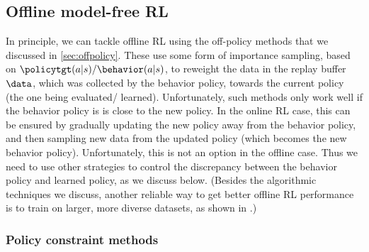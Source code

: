 





\subsection{Offline model-free RL}


In principle, we can tackle offline RL using the off-policy methods
that we discussed in \cref{sec:offpolicy}.
These use some form of importance sampling, based on
$\policytgt(a|s)/\behavior(a|s)$, to reweight the data in the replay buffer $\data$,
which was collected by 
the behavior policy, towards the current policy (the one  being evaluated/ learned).
Unfortunately, such methods only work well if the behavior policy is
is close to the new policy. In the online RL case,
this can be ensured by gradually updating the new policy away from
the behavior policy, and then sampling new data  
from the updated policy (which becomes the new behavior policy).
Unfortunately, this is not an option in the offline case.
Thus we need to use other strategies to control the discrepancy
between the behavior policy and learned policy, as we discuss below.
(Besides the algorithmic techniques we discuss,
another reliable way to get better offline RL performance
is to train on larger, more diverse datasets,
as shown in \citep{Kumar2023offline}.)


\subsubsection{Policy constraint methods}

